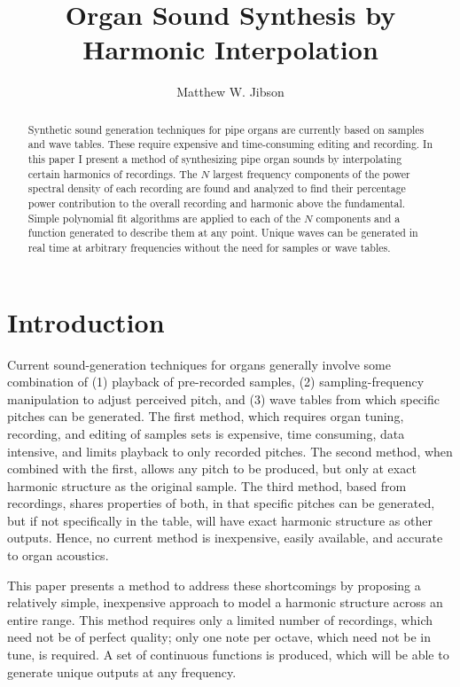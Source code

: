 \documentclass[twocolumn]{article}
\begin{document}
\title{Organ Sound Synthesis by Harmonic Interpolation}
\author{Matthew W. Jibson}

\maketitle{}

\begin{abstract}

Synthetic sound generation techniques for pipe organs are currently based on samples and wave tables. These require expensive and time-consuming editing and recording. In this paper I present a method of synthesizing pipe organ sounds by interpolating certain harmonics of recordings. The $N$ largest frequency components of the power spectral density of each recording are found and analyzed to find their percentage power contribution to the overall recording and harmonic above the fundamental. Simple polynomial fit algorithms are applied to each of the $N$ components and a function generated to describe them at any point. Unique waves can be generated in real time at arbitrary frequencies without the need for samples or wave tables.

\end{abstract}

\section{Introduction}

Current sound-generation techniques for organs generally involve some combination of (1) playback of pre-recorded samples, (2) sampling-frequency manipulation to adjust perceived pitch, and (3) wave tables from which specific pitches can be generated. The first method, which requires organ tuning, recording, and editing of samples sets is expensive, time consuming, data intensive, and limits playback to only recorded pitches. The second method, when combined with the first, allows any pitch to be produced, but only at exact harmonic structure as the original sample. The third method, based from recordings, shares properties of both, in that specific pitches can be generated, but if not specifically in the table, will have exact harmonic structure as other outputs. Hence, no current method is inexpensive, easily available, and accurate to organ acoustics.

This paper presents a method to address these shortcomings by proposing a relatively simple, inexpensive approach to model a harmonic structure across an entire range. This method requires only a limited number of recordings, which need not be of perfect quality; only one note per octave, which need not be in tune, is required. A set of continuous functions is produced, which will be able to generate unique outputs at any frequency.
\end{document}
